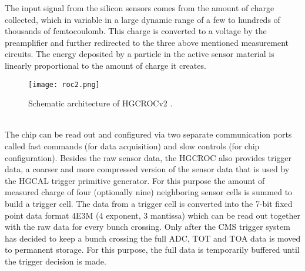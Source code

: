 \documentclass[../../main.tex]{subfiles}
\begin{document}
The input signal from the silicon sensors comes from the amount of charge collected, which in variable in a large dynamic range of a few to hundreds of thousands of femtocoulomb. This charge is converted to a voltage by the preamplifier and further redirected to the three above mentioned measurement circuits. The energy deposited by a particle in the active sensor material is linearly proportional to the amount of charge it creates.\\
\begin{figure}[htp]
	\begin{center}
		\texttt{[image: roc2.png]}
		\caption{Schematic architecture of HGCROCv2 \cite{tdr_roc}.}
		\label{fig:roc_schema}
	\end{center}
\end{figure}
\\
The chip can be read out and configured via two separate communication ports called fast commands (for data acquisition) and slow controls (for chip configuration). Besides the raw sensor data, the HGCROC also provides trigger data, a coarser and more compressed version of the sensor data that is used by the HGCAL trigger primitive generator. For this purpose the amount of measured charge of four (optionally nine) neighboring sensor cells is summed to build a trigger cell. The data from a trigger cell is converted into the 7-bit fixed point data format 4E3M (4 exponent, 3 mantissa) which can be read out together with the raw data for every bunch crossing. Only after the CMS trigger system has decided to keep a bunch crossing the full ADC, TOT and TOA data is moved to permanent storage. For this purpose, the full data is temporarily buffered until the trigger decision is made.\\
\end{document}
